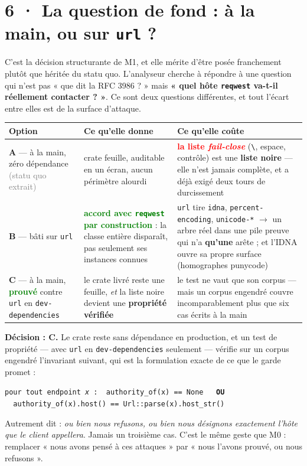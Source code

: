 \documentclass[10pt]{article}
\newcommand{\best}[1]{\textcolor{green}{\textbf{#1}}}
\newcommand{\pire}[1]{\textcolor{red}{\textbf{#1}}}
\newcommand{\sz}[1]{\textcolor{grey}{\small\textsf{#1}}}
\newcommand{\code}[1]{\texttt{\small #1}}
\newcommand{\fl}{$\rightarrow$}
\begin{document}
\section{6 · La question de fond : à la main, ou sur \code{url} ?}

C'est la décision structurante de M1, et elle mérite d'être posée franchement plutôt que héritée du
statu quo. L'analyseur cherche à répondre à une question qui n'est pas « que dit la RFC 3986 ? » mais
\textbf{« quel hôte \code{reqwest} va-t-il réellement contacter ? »}. Ce sont deux questions
différentes, et tout l'écart entre elles est de la surface d'attaque.

\begin{center}\footnotesize
\renewcommand{\arraystretch}{1.25}
\begin{tabular}{@{}>{\raggedright\arraybackslash}p{3.1cm} >{\raggedright\arraybackslash}p{6.2cm} >{\raggedright\arraybackslash}p{6.0cm}@{}}
\toprule
\textbf{Option} & \textbf{Ce qu'elle donne} & \textbf{Ce qu'elle coûte} \\
\midrule
\textbf{A} --- à la main, zéro dépendance \sz{(statu quo extrait)} &
crate feuille, auditable en un écran, aucun périmètre alourdi &
\pire{la liste \emph{fail-close}} (\code{\textbackslash}, espace, contrôle) est une \textbf{liste noire} --- elle n'est jamais complète, et a déjà exigé deux tours de durcissement \\
\textbf{B} --- bâti sur \code{url} &
\best{accord avec \code{reqwest} par construction} : la classe entière disparaît, pas seulement ses instances connues &
\code{url} tire \code{idna}, \code{percent-encoding}, \code{unicode-*} \fl{} un arbre réel dans une pile preuve qui n'a \textbf{qu'une} arête ; et l'IDNA ouvre sa propre surface (homographes punycode) \\
\textbf{C} --- à la main, \best{prouvé} contre \code{url} en \code{dev-dependencies} &
le crate livré reste une feuille, \emph{et} la liste noire devient une \textbf{propriété vérifiée} &
le test ne vaut que son corpus --- mais un corpus engendré couvre incomparablement plus que six cas écrits à la main \\
\bottomrule
\end{tabular}
\end{center}

\begin{acquis}
\textbf{Décision : C.} Le crate reste sans dépendance en production, et un test de propriété --- avec
\code{url} en \code{dev-dependencies} seulement --- vérifie sur un corpus engendré l'invariant
suivant, qui est la formulation exacte de ce que le garde promet :

\smallskip
\code{pour tout endpoint \emph{x} : \ authority\_of(x) == None \ \ \textbf{OU} \ \ authority\_of(x).host() == Url::parse(x).host\_str()}
\smallskip

Autrement dit : \emph{ou bien nous refusons, ou bien nous désignons exactement l'hôte que le client
appellera}. Jamais un troisième cas. C'est le même geste que M0 : remplacer « nous avons pensé à ces
attaques » par « nous l'avons prouvé, ou nous refusons ».
\end{acquis}
\end{document}
